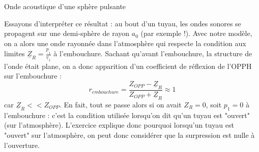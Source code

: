 \begin{exo}[PSI][2][TD]{Onde acoustique d’une sphère pulsante}
\begin{quest}
{        Essayons d'interpréter ce résultat : au bout d'un tuyau, les ondes sonores se propagent sur une demi-sphère de rayon $a_0$ (par exemple !). Avec notre modèle, on a alors une onde rayonnée dans l'atmosphère qui respecte la condition aux limites $\underline{Z}_R=\frac{\underline{p}_1}{\underline{v}_1}$ à l'embouchure. Sachant qu'avant l'embouchure, la structure de l'onde était plane, on a donc apparition d'un coefficient de réflexion de l'OPPH sur l'embouchure :
        \begin{equation*}
            r_{embouchure}=\frac{Z_{OPP}-\underline{Z}_R}{Z_{OPP} + \underline{Z}_R} \approx 1
        \end{equation*}
        car $\underline{Z}_R << Z_{OPP}$. En fait, tout se passe alors si on avait $Z_R=0$, soit $p_1=0$ à l'embouchure : c'est la condition utilisée lorsqu'on dit qu'un tuyau est "ouvert" (sur l'atmosphère). L'exercice explique donc pourquoi lorsqu'un tuyau est "ouvert" sur l'atmosphère, on peut donc considérer que la surpression est nulle à l'ouverture.

        }
    \end{quest}
\end{exo}

